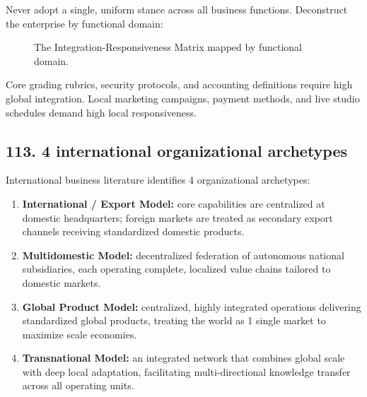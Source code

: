 Never adopt a single, uniform stance across all business functions. Deconstruct the enterprise by functional domain:

\begin{figure}[htbp]
\centering
{}
\caption{The Integration-Responsiveness Matrix mapped by functional domain.}
\label{fig:ir_grid}
\end{figure}

Core grading rubrics, security protocols, and accounting definitions require high global integration. Local marketing campaigns, payment methods, and live studio schedules demand high local responsiveness.

\subsection{113. 4 international organizational archetypes}

International business literature identifies 4 organizational archetypes:
\begin{enumerate}
    \item \textbf{International / Export Model:} core capabilities are centralized at domestic headquarters; foreign markets are treated as secondary export channels receiving standardized domestic products.
    \item \textbf{Multidomestic Model:} decentralized federation of autonomous national subsidiaries, each operating complete, localized value chains tailored to domestic markets.
    \item \textbf{Global Product Model:} centralized, highly integrated operations delivering standardized global products, treating the world as 1 single market to maximize scale economies.
    \item \textbf{Transnational Model:} an integrated network that combines global scale with deep local adaptation, facilitating multi-directional knowledge transfer across all operating units.
\end{enumerate}

